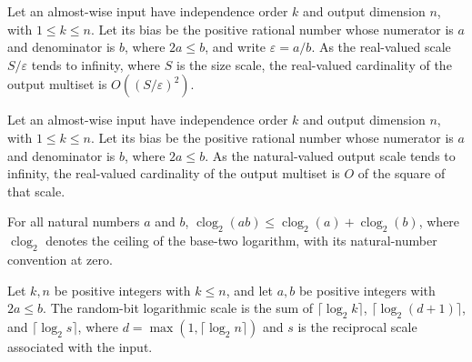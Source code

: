 \begin{theorem}
\label{FABL.almostKWiseOutputMultiset_card_isBigO_realScale}
\leanok
{}
Let an almost-wise input have independence order $k$ and output dimension $n$, with
$1\le k\le n$. Let its bias be the positive rational number whose numerator is $a$ and
denominator is $b$, where $2a\le b$, and write $\varepsilon=a/b$. As the real-valued
scale $S/\varepsilon$ tends to infinity, where $S$ is the size scale, the real-valued
cardinality of the output multiset is $O((S/\varepsilon)^2)$.
\end{theorem}

\begin{theorem}
\label{FABL.almostKWiseOutputMultiset_card_isBigO_naturalScale}
\leanok
{}
Let an almost-wise input have independence order $k$ and output dimension $n$, with
$1\le k\le n$. Let its bias be the positive rational number whose numerator is $a$ and
denominator is $b$, where $2a\le b$. As the natural-valued output scale tends to
infinity, the real-valued cardinality of the output multiset is $O$ of the square of
that scale.
\end{theorem}

\begin{theorem}
\label{FABL.binaryClog_mul_le}
\leanok
{}
For all natural numbers $a$ and $b$, $\operatorname{clog}_2(ab) \le
\operatorname{clog}_2(a)+\operatorname{clog}_2(b)$, where $\operatorname{clog}_2$
denotes the ceiling of the base-two logarithm, with its natural-number convention at
zero.
\end{theorem}

\begin{definition}
\label{FABL.AlmostKWiseInput.randomBitLogScale}
\leanok
{}
Let $k,n$ be positive integers with $k\le n$, and let $a,b$ be positive integers with
$2a\le b$. The random-bit logarithmic scale is the sum of $\lceil\log_2 k\rceil$,
$\lceil\log_2(d+1)\rceil$, and $\lceil\log_2 s\rceil$, where $d=\max(1,\lceil\log_2
n\rceil)$ and $s$ is the reciprocal scale associated with the input.
\end{definition}

